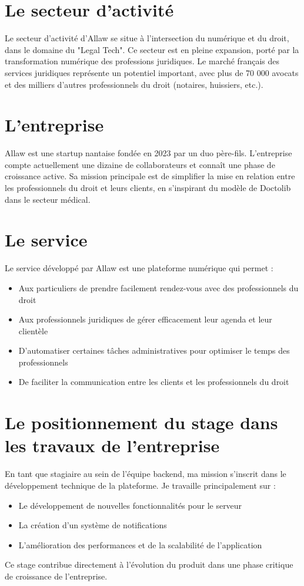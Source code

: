 \section{Le secteur d'activité}
Le secteur d'activité d'Allaw se situe à l'intersection du numérique et du droit, 
dans le domaine du "Legal Tech". Ce secteur est en pleine expansion, porté par la 
transformation numérique des professions juridiques.
Le marché français des services juridiques représente un potentiel important,
avec plus de 70 000 avocats et des milliers d'autres professionnels du droit
(notaires, huissiers, etc.).

\section{L'entreprise}
Allaw est une startup nantaise fondée en 2023 par un duo père-fils. L'entreprise 
compte actuellement une dizaine de collaborateurs et connaît une phase de croissance 
active. Sa mission principale est de simplifier la mise en relation entre les 
professionnels du droit et leurs clients, en s'inspirant du modèle de Doctolib 
dans le secteur médical.

\section{Le service}
Le service développé par Allaw est une plateforme numérique qui permet :
\begin{itemize}
    \item Aux particuliers de prendre facilement rendez-vous avec des professionnels du droit
    \item Aux professionnels juridiques de gérer efficacement leur agenda et leur clientèle
    \item D'automatiser certaines tâches administratives pour optimiser le temps des professionnels
    \item De faciliter la communication entre les clients et les professionnels du droit
\end{itemize}

\section{Le positionnement du stage dans les travaux de l'entreprise}
En tant que stagiaire au sein de l'équipe backend, ma mission s'inscrit dans le 
développement technique de la plateforme. Je travaille principalement sur :
\begin{itemize}
    \item Le développement de nouvelles fonctionnalités pour le serveur
    \item La création d'un système de notifications
    \item L'amélioration des performances et de la scalabilité de l'application
\end{itemize}

Ce stage contribue directement à l'évolution du produit dans une phase critique 
de croissance de l'entreprise.

